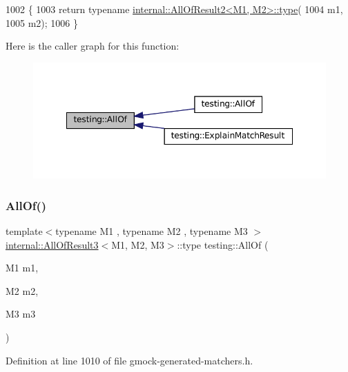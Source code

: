 \begin{DoxyCode}
1002                     \{
1003   \textcolor{keywordflow}{return} \textcolor{keyword}{typename} \hyperlink{namespacegenerate__debs_a50bc9a7ecac9584553e089a448bcde58}{internal::AllOfResult2<M1, M2>::type}(
1004       m1,
1005       m2);
1006 \}
\end{DoxyCode}
Here is the caller graph for this function\+:
\nopagebreak
\begin{figure}[H]
\begin{center}
\leavevmode
\includegraphics[width=348pt]{namespacetesting_af7618e8606c1cb45738163688944e2b7_icgraph}
\end{center}
\end{figure}
\mbox{\label{namespacetesting_a75934d8ea6b986d2157a5ebfe68f9904}} 
\subsubsection{\texorpdfstring{All\+Of()}{AllOf()}\hspace{0.1cm}{\footnotesize\ttfamily [2/9]}}
{\footnotesize\ttfamily template$<$typename M1 , typename M2 , typename M3 $>$ \\
\hyperlink{structtesting_1_1internal_1_1AllOfResult3}{internal\+::\+All\+Of\+Result3}$<$M1, M2, M3$>$\+::type testing\+::\+All\+Of (\begin{DoxyParamCaption}\item[{M1}]{m1,  }\item[{M2}]{m2,  }\item[{M3}]{m3 }\end{DoxyParamCaption})\hspace{0.3cm}{\ttfamily [inline]}}



Definition at line 1010 of file gmock-\/generated-\/matchers.\+h.



